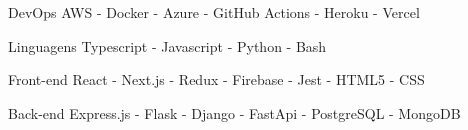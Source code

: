 

\begin{cvskills}

  \cvskill
    {DevOps} %
    {AWS - Docker - Azure - GitHub Actions - Heroku - Vercel} %

  \cvskill
    {Linguagens} %
    {Typescript - Javascript - Python - Bash} %

  \cvskill
      {Front-end} %
      {React - Next.js - Redux - Firebase - Jest - HTML5 - CSS} %

  \cvskill
    {Back-end} %
    {Express.js - Flask - Django - FastApi -  PostgreSQL - MongoDB} %

\end{cvskills}
